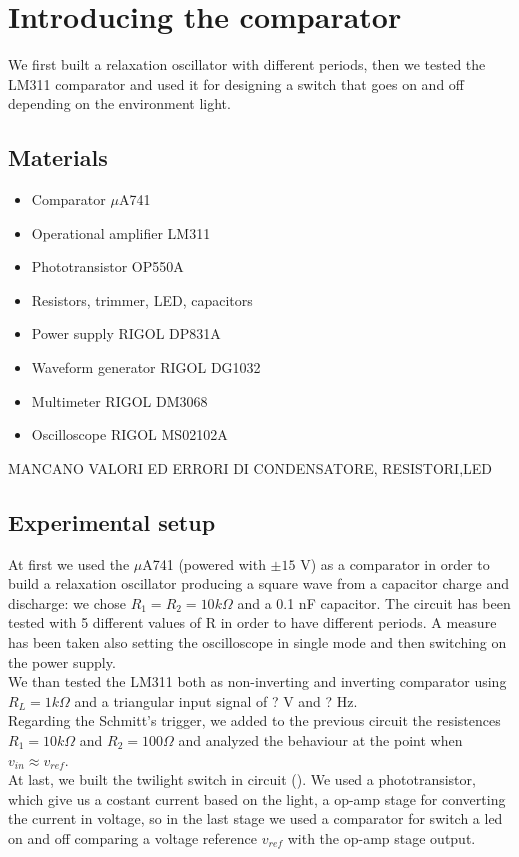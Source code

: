 
\chapter{Introducing the comparator}
We first built a relaxation oscillator with different periods, then we tested the LM311 comparator and used it for designing a switch that goes on and off depending on the environment light.

\section{Materials}
\begin{itemize}
\item Comparator $\mu$A741
\item Operational amplifier LM311
\item Phototransistor OP550A
\item Resistors, trimmer, LED, capacitors
\item Power supply RIGOL DP831A
\item Waveform generator RIGOL DG1032
\item Multimeter RIGOL DM3068
\item Oscilloscope RIGOL MS02102A
\end{itemize}
MANCANO VALORI ED ERRORI DI CONDENSATORE, RESISTORI,LED

\section{Experimental setup}
At first we used the $\mu$A741 (powered with $\pm15$ V) as a comparator in order to build a relaxation oscillator producing a square wave from a capacitor charge and discharge: we chose $R_1 = R_2 = 10k\Omega$ and a 0.1 nF capacitor. The circuit has been tested with 5 different values of R in order to have different periods. A measure has been taken also setting the oscilloscope in single mode and then switching on the power supply.\\
We than tested the LM311 both as non-inverting and inverting comparator using $R_L = 1k\Omega$ and a triangular input signal of ? V and ? Hz.\\
Regarding the Schmitt's trigger, we added to the previous circuit the resistences $R_1 = 10 k\Omega$ and $R_2 = 100 \Omega$ and analyzed the behaviour at the point when $v_{in}\approx v_{ref}$.\\
At last, we built the twilight switch in circuit (). We used a phototransistor, which give us a costant current based on the light, a op-amp stage for converting the current in voltage, so in the last stage we used a comparator for switch a led on and off comparing a voltage reference $v_{ref}$ with the op-amp stage output.

